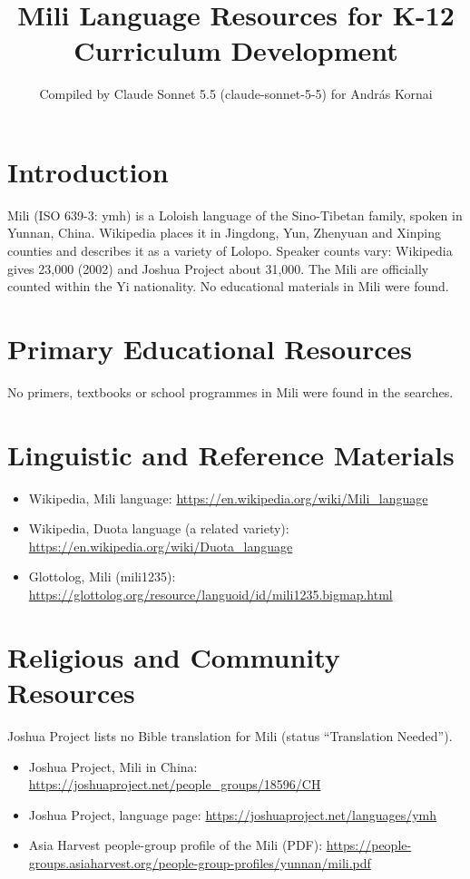 \documentclass[12pt]{article}
\title{Mili Language Resources for K-12 Curriculum Development}
\author{Compiled by Claude Sonnet 5.5 (claude-sonnet-5-5) for Andr\'as Kornai}
\date{}
\begin{document}
\maketitle

\section{Introduction}
Mili (ISO 639-3: ymh) is a Loloish language of the Sino-Tibetan family, spoken in Yunnan, China. Wikipedia places it in Jingdong, Yun, Zhenyuan and Xinping counties and describes it as a variety of Lolopo. Speaker counts vary: Wikipedia gives 23,000 (2002) and Joshua Project about 31,000. The Mili are officially counted within the Yi nationality. No educational materials in Mili were found.

\section{Primary Educational Resources}
No primers, textbooks or school programmes in Mili were found in the searches.

\section{Linguistic and Reference Materials}
\begin{itemize}
\item Wikipedia, Mili language: \url{https://en.wikipedia.org/wiki/Mili_language}
\item Wikipedia, Duota language (a related variety): \url{https://en.wikipedia.org/wiki/Duota_language}
\item Glottolog, Mili (mili1235): \url{https://glottolog.org/resource/languoid/id/mili1235.bigmap.html}
\end{itemize}

\section{Religious and Community Resources}
Joshua Project lists no Bible translation for Mili (status ``Translation Needed'').
\begin{itemize}
\item Joshua Project, Mili in China: \url{https://joshuaproject.net/people_groups/18596/CH}
\item Joshua Project, language page: \url{https://joshuaproject.net/languages/ymh}
\item Asia Harvest people-group profile of the Mili (PDF): \url{https://people-groups.asiaharvest.org/people-group-profiles/yunnan/mili.pdf}
\end{itemize}
\end{document}
